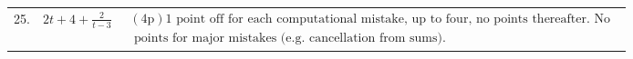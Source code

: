 \documentclass{ximera}
\begin{document}
\begin{center}
\begin{tabular}{l|l|l}
25. & $2 t+4+\frac{2}{t-3}$ & $\begin{array}{l}(4 \mathrm{p}) 1 \text { point off for each computational mistake, up to four, no points thereafter. No } \\ \text { points for major mistakes (e.g. cancellation from sums). }\end{array}$ \\
\end{tabular}
\end{center}
\end{document}
